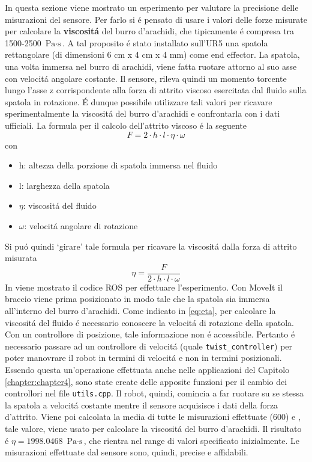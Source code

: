In questa sezione viene mostrato un esperimento per valutare la precisione delle misurazioni del sensore. 
Per farlo si \'{e} pensato di usare i valori delle forze misurate per calcolare la \textbf{viscosit\'{a}} del burro d'arachidi, 
che tipicamente \'{e} compresa tra 1500-2500 $\text{Pa} \cdot \text{s}$. 
A tal proposito \'{e} stato installato sull'UR5 una spatola rettangolare (di dimensioni 6 cm x 4 cm x 4 mm) come end effector. 
La spatola, una volta immersa nel burro di arachidi, viene fatta ruotare attorno al suo asse con velocit\'{a} angolare 
costante. Il sensore, rileva quindi un momento torcente lungo l'asse z corrispondente alla forza di attrito viscoso esercitata 
dal fluido sulla spatola in rotazione. \'{E} dunque possibile utilizzare tali valori per ricavare sperimentalmente 
la viscosit\'{a} del burro d'arachidi e confrontarla con i dati ufficiali. 
La formula per il calcolo dell'attrito viscoso \'{e} la seguente 
\begin{equation*}
    F = 2 \cdot h \cdot l \cdot \eta \cdot \omega
\end{equation*}
con 
\begin{itemize}
    \item h: altezza della porzione di spatola immersa nel fluido
    \item l: larghezza della spatola
    \item $\eta$: viscosit\'{a} del fluido
    \item $\omega$: velocit\'{a} angolare di rotazione
\end{itemize}
Si pu\'{o} quindi `girare' tale formula per ricavare la viscosit\'{a} dalla forza di attrito misurata 
\begin{equation} \label{eq:eta}
    \eta = \frac{F}{2 \cdot h \cdot l \cdot \omega}
\end{equation}
In \cite{viscosity} viene mostrato il codice ROS per effettuare l'esperimento. 
Con MoveIt il braccio viene prima posizionato in modo tale che la spatola sia immersa all'interno del burro d'arachidi. 
Come indicato in \ref{eq:eta}, per calcolare la viscosit\'{a} del fluido \'{e} necessario conoscere 
la velocit\'{a} di rotazione della spatola. Con un controllore di posizione, tale informazione non \'{e} accessibile. 
Pertanto \'{e} necessario passare ad un controllore di velocit\'{a} (quale \verb|twist_controller|) per poter manovrare il robot in 
termini di velocit\'{a} e non in termini posizionali. Essendo questa un'operazione effettuata anche nelle applicazioni del 
Capitolo \ref{chapter:chapter4}, sono state create delle apposite funzioni per il cambio dei controllori nel file \verb|utils.cpp|. 
Il robot, quindi, comincia a far ruotare su se stessa la spatola a velocit\'{a} costante mentre il sensore acquisisce i dati della 
forza d'attrito. 
Viene poi calcolata la media di tutte le misurazioni effettuate (600) e , tale valore, viene usato per calcolare la viscosit\'{a} 
del burro d'arachidi. 
Il risultato \'{e} $\eta = 1998.0468$ $\text{Pa} \cdot \text{s}$, che rientra nel range di valori specificato inizialmente. 
Le misurazioni effettuate dal sensore sono, quindi, precise e affidabili.